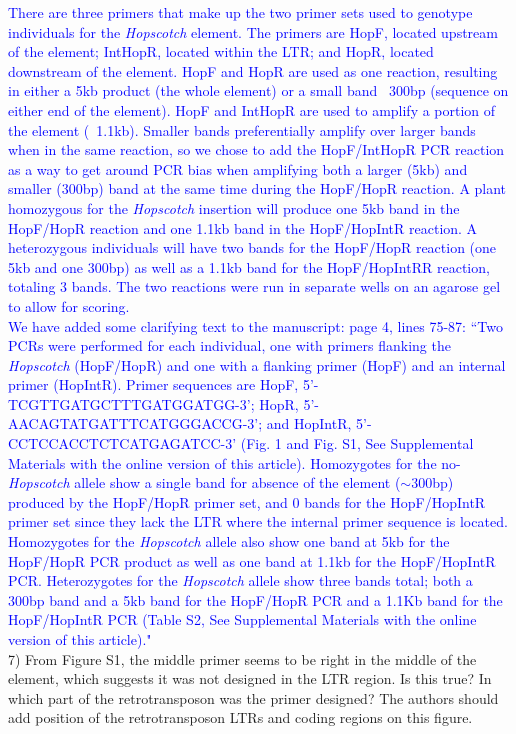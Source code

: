 \documentclass[11pt]{article}
\newcommand{\res}[1]{\noindent \textcolor{blue}{{#1}} \\}
\begin{document}
\res{There are three primers that make up the two primer sets used to genotype individuals for the \emph{Hopscotch} element. The primers are HopF, located upstream of the element; IntHopR, located within the LTR; and HopR, located downstream of the element. HopF and HopR are used as one reaction, resulting in either a 5kb product (the whole element) or a small band ~300bp (sequence on either end of the element). HopF and IntHopR are used to amplify a portion of the element (~1.1kb). Smaller bands preferentially amplify over larger bands when in the same reaction, so we chose to add the HopF/IntHopR PCR reaction as a way to get around PCR bias when amplifying both a larger (5kb) and smaller (300bp) band at the same time during the HopF/HopR reaction. A plant homozygous for the \emph{Hopscotch} insertion will produce one 5kb band in the HopF/HopR reaction and one 1.1kb band in the HopF/HopIntR reaction. A heterozygous individuals will have two bands for the HopF/HopR reaction (one 5kb and one 300bp) as well as a 1.1kb band for the HopF/HopIntRR reaction, totaling 3 bands. The two reactions were run in separate wells on an agarose gel to allow for scoring.}

\res{We have added some clarifying text to the manuscript: page 4, lines 75-87: ``Two PCRs were performed for each individual, one with primers flanking the \emph{Hopscotch} (HopF/HopR) and one with a flanking primer (HopF) and an internal primer (HopIntR). Primer sequences are HopF, {\small 5'-TCGTTGATGCTTTGATGGATGG-3'}; 
HopR, {\small 5'-AACAGTATGATTTCATGGGACCG-3'}; and HopIntR, {\small  5'-CCTCCACCTCTCATGAGATCC-3'} (Fig. 1 and Fig. S1, See Supplemental Materials with the online version of this article). Homozygotes for the no-\emph{Hopscotch} allele show a single band for absence of the element ($\sim$300bp) produced by the HopF/HopR primer set, and 0 bands for the HopF/HopIntR primer set since they lack the LTR where the internal primer sequence is located. Homozygotes for the \emph{Hopscotch} allele also show one band at 5kb for the HopF/HopR PCR product as well as one band at 1.1kb for the HopF/HopIntR PCR. Heterozygotes for the \emph{Hopscotch} allele show three bands total; both a 300bp band and a 5kb band for the HopF/HopR PCR and a 1.1Kb band for the HopF/HopIntR PCR (Table S2, See Supplemental Materials with the online version of this article)."}





7) From Figure S1, the middle primer seems to be right in the middle of the element, which suggests it was not designed in the LTR region. Is this true? In which part of the retrotransposon was the primer designed? The authors should add position of the retrotransposon LTRs and coding regions on this figure. \\
\end{document}
